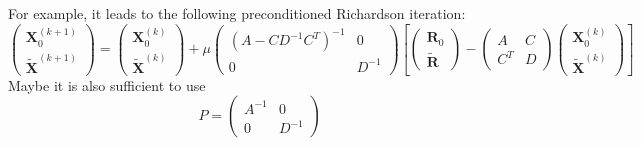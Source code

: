 \documentclass[12pt]{article}
\renewcommand{\vec}[1]{\boldsymbol{#1}}
\begin{document}
For example, it leads to the following preconditioned Richardson iteration:
\begin{equation}
\begin{pmatrix}
  \vec{X}^{(k+1)}_0\\ \tilde{\vec{X}}^{(k+1)}
\end{pmatrix}
= 
\begin{pmatrix}
\vec{X}^{(k)}_0\\ \tilde{\vec{X}}^{(k)}
\end{pmatrix}
+
\mu
\begin{pmatrix}
\left(A-CD^{-1}C^T\right)^{-1} & 0 \\ 0 & D^{-1}
\end{pmatrix}
\left[
\begin{pmatrix}
  \vec{R}_0 \\ \tilde{\vec{R}}
\end{pmatrix}
-
\begin{pmatrix}
A & C \\ C^T & D
\end{pmatrix}
\begin{pmatrix}
\vec{X}^{(k)}_0 \\ \tilde{\vec{X}}^{(k)}
\end{pmatrix}
\right]
\end{equation}
Maybe it is also sufficient to use
\begin{equation}
P=
\begin{pmatrix}
A^{-1}  & 0 \\
0 & D^{-1}  
\end{pmatrix}
\end{equation}
\end{document}
